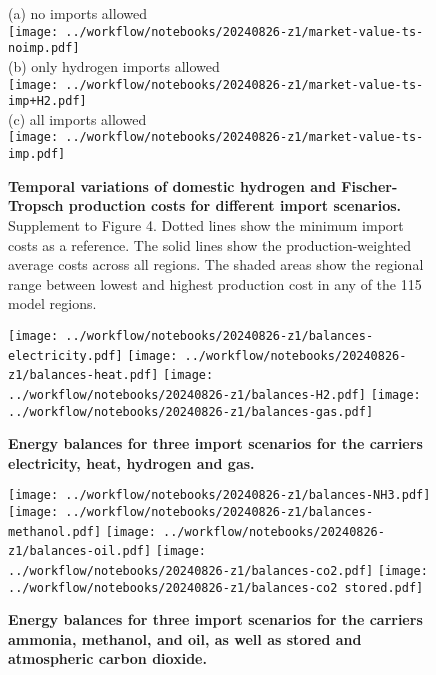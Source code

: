 \begin{figure*}
    \footnotesize
    (a) no imports allowed \\
    \texttt{[image: ../workflow/notebooks/20240826-z1/market-value-ts-noimp.pdf]} \\
    (b) only hydrogen imports allowed \\
    \texttt{[image: ../workflow/notebooks/20240826-z1/market-value-ts-imp+H2.pdf]} \\
    (c) all imports allowed \\
    \texttt{[image: ../workflow/notebooks/20240826-z1/market-value-ts-imp.pdf]}
    \caption{\textbf{Temporal variations of domestic hydrogen and
    Fischer-Tropsch production costs for different import scenarios.} Supplement to Figure 4. Dotted lines show
    the minimum import costs as a reference. The solid lines show the
    production-weighted average costs across all regions. The shaded areas show
    the regional range between lowest and highest production cost in any of the
    115 model regions.}
    \label{fig:si:market-value-ts}
\end{figure*}



\begin{figure*}
    \texttt{[image: ../workflow/notebooks/20240826-z1/balances-electricity.pdf]}
    \texttt{[image: ../workflow/notebooks/20240826-z1/balances-heat.pdf]}
    \texttt{[image: ../workflow/notebooks/20240826-z1/balances-H2.pdf]}
    \texttt{[image: ../workflow/notebooks/20240826-z1/balances-gas.pdf]}
    \caption{\textbf{Energy balances for three import scenarios for the carriers electricity, heat, hydrogen and gas.}
    }
    \label{fig:si:balances-a}
\end{figure*}

\begin{figure*}
    \texttt{[image: ../workflow/notebooks/20240826-z1/balances-NH3.pdf]}
    \texttt{[image: ../workflow/notebooks/20240826-z1/balances-methanol.pdf]}
    \texttt{[image: ../workflow/notebooks/20240826-z1/balances-oil.pdf]}
    \texttt{[image: ../workflow/notebooks/20240826-z1/balances-co2.pdf]}
    \texttt{[image: ../workflow/notebooks/20240826-z1/balances-co2 stored.pdf]}
    \caption{\textbf{
        Energy balances for three import scenarios for the carriers
        ammonia, methanol, and oil, as well as stored and atmospheric carbon dioxide.
    }
    }
    \label{fig:si:balances-b}
\end{figure*}


